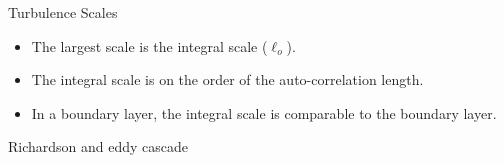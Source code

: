 \begin{frame}{Turbulence Scales}
\begin{itemize}
	\item The largest scale is the integral scale ($\ell_o$).
	\item The integral scale is on the order of the auto-correlation length.
	\item In a boundary layer, the integral scale is comparable to the boundary layer.   	
\end{itemize}
\end{frame}


\begin{frame}{Richardson and eddy cascade}
  

\end{frame}
